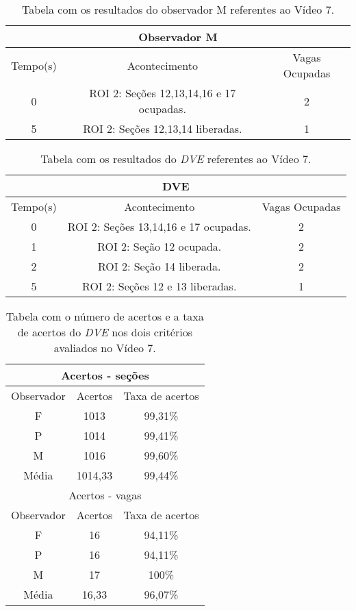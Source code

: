 \begin{table}[H]
\begin{center}
\begin{tabular}{|c||c||c|}
\hline
\multicolumn{3}{|c|}{Observador M}  \\ \hline \hline
Tempo(s) & Acontecimento & Vagas Ocupadas \\ \hline
0 & ROI 2: Seções 12,13,14,16 e 17 ocupadas. & 2 \\ \hline
5 & ROI 2: Seções 12,13,14 liberadas. & 1 \\ 
\hline
\end{tabular}
\end{center}
\caption{Tabela com os resultados do observador M referentes ao Vídeo 7.}
\label{tab:video7M}
\end{table}

\begin{table}[H]
\begin{center}
\begin{tabular}{|c||c||c|}
\hline
\multicolumn{3}{|c|}{DVE}  \\ \hline \hline
Tempo(s) & Acontecimento & Vagas Ocupadas \\ \hline
0 & ROI 2: Seções 13,14,16 e 17 ocupadas. & 2 \\ \hline
1 & ROI 2: Seção 12 ocupada. & 2 \\ \hline
2 & ROI 2: Seção 14 liberada. & 2 \\ \hline
5 & ROI 2: Seções 12 e 13 liberadas. & 1 \\
\hline
\end{tabular}
\end{center}
\caption{Tabela com os resultados do \textit{DVE} referentes ao Vídeo 7.}
\label{tab:video7}
\end{table}

\begin{table}[H]
\begin{center}
\begin{tabular}{|c||c||c|}
\hline
\multicolumn{3}{|c|}{Acertos - seções}  \\ \hline
Observador & Acertos & Taxa de acertos \\ \hline
F & 1013 & 99,31\% \\  \hline
P & 1014 & 99,41\% \\ \hline
M & 1016 & 99,60\% \\ \hline
Média & 1014,33 & 99,44\% \\
\hline
\hline
\multicolumn{3}{|c|}{Acertos - vagas}  \\ \hline \hline
Observador & Acertos & Taxa de acertos \\ \hline
F & 16 & 94,11\% \\  \hline
P & 16 & 94,11\% \\ \hline
M & 17 & 100\% \\ \hline
Média & 16,33 & 96,07\% \\
\hline
\end{tabular}
\end{center}
\caption{Tabela com o número de acertos e a taxa de acertos do \textit{DVE} nos dois 
critérios avaliados no Vídeo 7.}
\label{tab:rvideo7}
\end{table}

